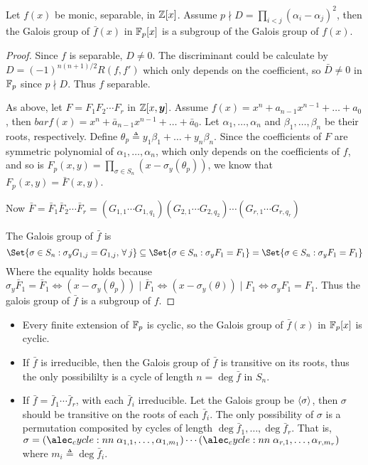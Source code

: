 \begin{theorem}
  Let $f(x)$ be monic, separable, in $\mathbb{Z}[x]$. Assume $p \nmid D = \prod_{i < j} (\alpha_i - \alpha_j)^2$,
  then the Galois group of $\bar{f}(x)$ in $\mathbb{F}_p[x]$ is a subgroup of the Galois group of $f(x)$.

  \begin{proof}
    Since $f$ is separable, $D \neq 0$. The discriminant could be calculate
    by $D = (-1)^{n(n+1)/2} R(f, f')$ which only depends on the coefficient,
    so $\bar{D} \neq 0$ in $\mathbb{F}_p$ since $p \nmid D$. Thus $f$ separable.

    As above, let $F = F_1 F_2 \dotsm F_r$ in $\mathbb{Z}[x, \bm{y}]$.
    Assume $f(x) = x^n + a_{n-1} x^{n-1} + \dots + a_0$, then $bar{f}(x) = x^n + \bar{a}_{n-1}x^{n-1} + \dots + \bar{a}_0$.
    Let $\alpha_1, \dots, \alpha_n$ and $\beta_1, \dots, \beta_n$ be their roots, respectively.
    Define $\theta_p \triangleq y_1 \beta_1 + \dots + y_n \beta_n$.
    Since the coefficients of $F$ are symmetric polynomial of $\alpha_1, \dots, \alpha_n$, which
    only depends on the coefficients of $f$, and so is $F_p(x, y) = \prod_{\sigma \in S_n}(x - \sigma_y(\theta_p))$,
    we know that $F_p(x, y) = \bar{F}(x, y)$.

    Now $\bar{F} = \bar{F}_1 \bar{F}_2 \dotsm \bar{F}_r
    = (G_{1, 1} \dotsm G_{1, q_1})(G_{2, 1} \dotsm G_{2, q_2}) \dotsm (G_{r, 1} \dotsm G_{r, q_r})$

    The Galois group of $\bar{f}$ is
    \[ \Set{ \sigma \in S_n : \sigma_y G_{1, j} = G_{1, j}, \, \forall j }
      \subseteq \Set{ \sigma \in S_n : \sigma_y F_1 = F_1 } = \Set{\sigma \in S_n : \sigma_y F_1 = F_1} \]
    Where the equality holds because $\sigma_y \bar{F}_1 = \bar{F}_1 \iff (x - \sigma_y(\theta_p)) \mid \bar{F}_1
    \iff (x - \sigma_y(\theta)) \mid F_1 \iff \sigma_y F_1 = F_1$. Thus the galois group
    of $\bar{f}$ is a subgroup of $f$.
  \end{proof}
\end{theorem}

\begin{fact} \hfill
  \begin{itemize}
    \item Every finite extension of $\mathbb{F}_p$ is cyclic, so the Galois group of $\bar{f}(x)$
      in $\mathbb{F}_p[x]$ is cyclic.
    \item If $\bar{f}$ is irreducible, then the Galois group of $\bar{f}$ is transitive on its roots,
      thus the only possibililty is a cycle of length $n = \deg \bar{f}$ in $S_n$.
    \item If $\bar{f} = \bar{f}_1 \dotsm \bar{f}_r$, with each $\bar{f}_i$ irreducible.
      Let the Galois group be $\langle\sigma\rangle$, then $\sigma$ should be
      transitive on the roots of each $\bar{f}_i$. The only possibility of $\sigma$
      is a permutation composited by cycles of length $\deg \bar{f}_1, \dots, \deg \bar{f}_r$.
      That is, $\sigma = \cycle{\alpha_{1,1}, \dots, \alpha_{1, m_1}} \dotsm
      \cycle{\alpha_{r,1}, \dots, \alpha_{r, m_r}}$ where $m_i \triangleq \deg \bar{f}_i$.
  \end{itemize}
\end{fact}
